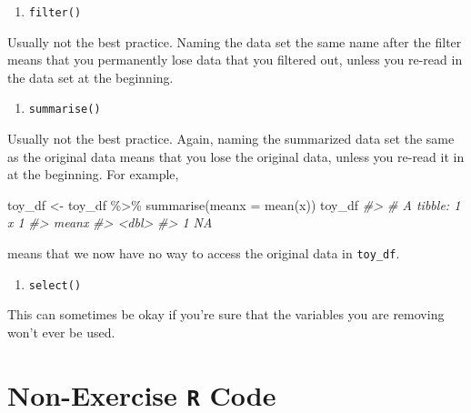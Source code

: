 \documentclass[
]{book}
\newenvironment{Shaded}{\begin{snugshade}}{\end{snugshade}}
\newcommand{\AttributeTok}[1]{\textcolor[rgb]{0.77,0.63,0.00}{#1}}
\newcommand{\CommentTok}[1]{\textcolor[rgb]{0.56,0.35,0.01}{\textit{#1}}}
\newcommand{\FunctionTok}[1]{\textcolor[rgb]{0.00,0.00,0.00}{#1}}
\newcommand{\NormalTok}[1]{#1}
\newcommand{\OtherTok}[1]{\textcolor[rgb]{0.56,0.35,0.01}{#1}}
\newcommand{\SpecialCharTok}[1]{\textcolor[rgb]{0.00,0.00,0.00}{#1}}
\providecommand{\tightlist}{%
  \setlength{\itemsep}{0pt}\setlength{\parskip}{0pt}}
\begin{document}
\begin{enumerate}
\def\labelenumi{\alph{enumi}.}
\setcounter{enumi}{2}
\tightlist
\item
  \texttt{filter()}
\end{enumerate}

Usually not the best practice. Naming the data set the same name after the filter means that you permanently lose data that you filtered out, unless you re-read in the data set at the beginning.

\begin{enumerate}
\def\labelenumi{\alph{enumi}.}
\setcounter{enumi}{3}
\tightlist
\item
  \texttt{summarise()}
\end{enumerate}

Usually not the best practice. Again, naming the summarized data set the same as the original data means that you lose the original data, unless you re-read it in at the beginning. For example,

\begin{Shaded}
\begin{Highlighting}[]
\NormalTok{toy\_df }\OtherTok{\textless{}{-}}\NormalTok{ toy\_df }\SpecialCharTok{\%\textgreater{}\%} \FunctionTok{summarise}\NormalTok{(}\AttributeTok{meanx =} \FunctionTok{mean}\NormalTok{(x))}
\NormalTok{toy\_df}
\CommentTok{\#\textgreater{} \# A tibble: 1 x 1}
\CommentTok{\#\textgreater{}   meanx}
\CommentTok{\#\textgreater{}   \textless{}dbl\textgreater{}}
\CommentTok{\#\textgreater{} 1    NA}
\end{Highlighting}
\end{Shaded}

means that we now have no way to access the original data in \texttt{toy\_df}.

\begin{enumerate}
\def\labelenumi{\alph{enumi}.}
\setcounter{enumi}{4}
\tightlist
\item
  \texttt{select()}
\end{enumerate}

This can sometimes be okay if you're sure that the variables you are removing won't ever be used.

\hypertarget{rcode-3}{%
\section{\texorpdfstring{Non-Exercise \texttt{R} Code}{Non-Exercise R Code}}\label{rcode-3}}
\end{document}
